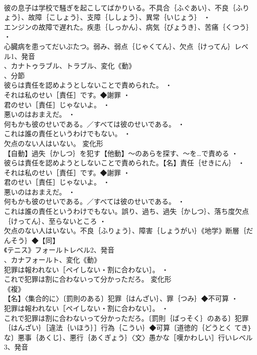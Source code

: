 \documentclass[8pt]{extreport}
\begin{document}
\begin{CJK}{UTF8}{min}
\\	彼の息子は学校で騒ぎを起こしてばかりいる。不具合｛ふぐあい｝、不良｛ふりょう｝、故障｛こしょう｝、支障｛ししょう｝、異常｛いじょう｝ ・
\\	エンジンの故障で遅れた。疾患｛しっかん｝、病気｛びょうき｝、苦痛｛くつう｝ ・
\\	心臓病を患ってだいぶたつ。弱み、弱点｛じゃくてん｝、欠点｛けってん｝レベル1、発音
\\	、カナトゥラブル、トラブル、変化《動》
\\	、分節
\\	彼らは責任を認めようとしないことで責められた。 ・
\\	それは私のせい［責任］です。◆謝罪 ・
\\	君のせい［責任］じゃないよ。 ・
\\	悪いのはおまえだ。 ・
\\	何もかも彼のせいである。／すべては彼のせいである。 ・
\\	これは誰の責任というわけでもない。 ・
\\	欠点のない人はいない。	変化形 
\\	【自動】過失｛かしつ｝を犯す【他動】～のあらを探す、～を…で責める ・
\\	彼らは責任を認めようとしないことで責められた。【名】責任｛せきにん｝ ・
\\	それは私のせい［責任］です。◆謝罪 ・
\\	君のせい［責任］じゃないよ。 ・
\\	悪いのはおまえだ。 ・
\\	何もかも彼のせいである。／すべては彼のせいである。 ・
\\	これは誰の責任というわけでもない。誤り、過ち、過失｛かしつ｝、落ち度欠点｛けってん｝、至らないところ ・
\\	欠点のない人はいない。不良｛ふりょう｝、障害｛しょうがい｝《地学》断層｛だんそう｝◆【同】
\\	《テニス》フォールトレベル2、発音
\\	、カナフォールト、変化《動》
\\	犯罪は報われない［ペイしない・割に合わない］。 ・
\\	これで犯罪は割に合わないって分かっただろ。	変化形 
\\	《複》
\\	【名】〈集合的に〉〔罰則のある〕犯罪｛はんざい｝、罪｛つみ｝◆不可算 ・
\\	犯罪は報われない［ペイしない・割に合わない］。 ・
\\	これで犯罪は割に合わないって分かっただろ。〔罰則｛ばっそく｝のある〕犯罪｛はんざい｝［違法｛いほう｝］行為｛こうい｝◆可算〔道徳的｛どうとく てき｝な〕悪事｛あくじ｝、悪行｛あくぎょう｝〈文〉愚かな［嘆かわしい］行いレベル3、発音

\end{CJK}
\end{document}
